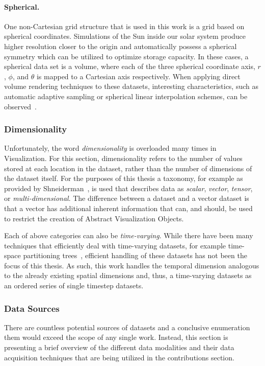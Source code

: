 \paragraph{Spherical. }  One non-Cartesian grid structure that is used in this work is a grid based on spherical coordinates.  Simulations of the Sun inside our solar system produce higher resolution closer to the origin and automatically possess a spherical symmetry which can be utilized to optimize storage capacity.  In these cases, a spherical data set is a  volume, where each of the three spherical coordinate axis, $r$, $\phi$, and $\theta$ is mapped to a Cartesian axis respectively.  When applying direct volume rendering techniques to these datasets, interesting characteristics, such as automatic adaptive sampling or spherical linear interpolation schemes, can be observed~\cite{balabanian2007sonar}.

\subsubsection{Dimensionality} \label{cha:intro:vp:da:dimensionality}
Unfortunately, the word \emph{dimensionality} is overloaded many times in Visualization.  For this section, dimensionality refers to the number of values stored at each location in the dataset, rather than the number of dimensions of the dataset itself.  For the purposes of this thesis a taxonomy, for example as provided by Shneiderman~\cite{shneiderman1996eyes}, is used that describes data as \emph{scalar}, \emph{vector}, \emph{tensor}, or \emph{multi-dimensional}.  The difference between a  dataset and a vector dataset is that a vector has additional inherent information that can, and should, be used to restrict the creation of Abstract Visualization Objects.

Each of above categories can also be \emph{time-varying}.  While there have been many techniques that efficiently deal with time-varying datasets, for example time-space partitioning trees~\cite{shen1999fast}, efficient handling of these datasets has not been the focus of this thesis.  As such, this work handles the temporal dimension analogous to the already existing spatial dimensions and, thus, a time-varying datasets as an ordered series of single timestep datasets.

\subsubsection{Data Sources} \label{cha:intro:vp:da:sources}
There are countless potential sources of datasets and a conclusive enumeration them would exceed the scope of any single work.  Instead, this section is presenting a brief overview of the different data modalities and their data acquisition techniques that are being utilized in the contributions section.

